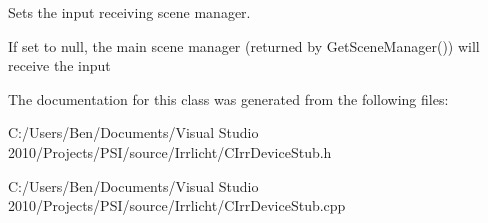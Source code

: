 Sets the input receiving scene manager. 

If set to null, the main scene manager (returned by Get\-Scene\-Manager()) will receive the input 

The documentation for this class was generated from the following files\-:\begin{DoxyCompactItemize}
\item 
C\-:/\-Users/\-Ben/\-Documents/\-Visual Studio 2010/\-Projects/\-P\-S\-I/source/\-Irrlicht/C\-Irr\-Device\-Stub.\-h\item 
C\-:/\-Users/\-Ben/\-Documents/\-Visual Studio 2010/\-Projects/\-P\-S\-I/source/\-Irrlicht/C\-Irr\-Device\-Stub.\-cpp\end{DoxyCompactItemize}
